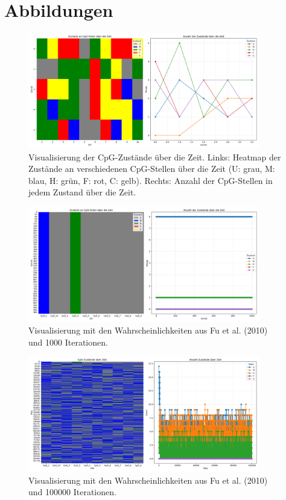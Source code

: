 \documentclass{SeminarV2}
\begin{document}
\section{Abbildungen}

\begin{figure}[htbp]
  \centering
  \includegraphics[width=0.9\textwidth]{images/cpg_states_plot.png}
  \caption{Visualisierung der CpG-Zust\"{a}nde \"{u}ber die Zeit. Links: Heatmap der Zust\"{a}nde an verschiedenen 
  CpG-Stellen \"{u}ber die Zeit (U: grau, M: blau, H: gr\"{u}n, F: rot, C: gelb). Rechts: Anzahl der CpG-Stellen in jedem Zustand \"{u}ber die Zeit.}
  \label{fig:cpg_states}
\end{figure}

\begin{figure}[htbp]
  \centering
  \includegraphics[width=0.9\textwidth]{images/cpg_states_plot_fu_1000.png}
  \caption{Visualisierung mit den Wahrscheinlichkeiten aus Fu et al. (2010) und 1000 Iterationen. \cite{fu-2010}}
  \label{fig:cpg_states_1000}
\end{figure}

\begin{figure}[htbp]
  \centering
  \includegraphics[width=0.9\textwidth]{images/cpg_states_plot_fu_100000.png}
  \caption{Visualisierung mit den Wahrscheinlichkeiten aus Fu et al. (2010) und 100000 Iterationen. \cite{fu-2010}}
  \label{fig:cpg_states_fu_100000}
\end{figure}
\end{document}
